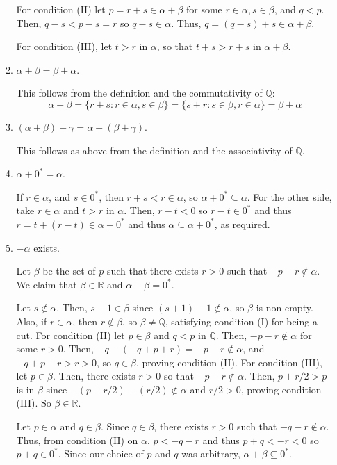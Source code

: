 \documentclass{scrbook}
\newcommand{\Q}{\mathbb{Q}}
\newcommand{\R}{\mathbb{R}}
\begin{document}
\begin{enumerate}[Step 1.]
\begin{enumerate}[({A}1)]
For condition (II) let $p = r + s \in \alpha + \beta$ for some $r \in \alpha, s \in \beta$, and $q < p$. Then, $q - s < p - s = r$ so $q - s \in \alpha$. Thus, $q = (q - s) + s \in \alpha + \beta$. 

For condition (III), let $t > r$ in $\alpha$, so that $t + s > r + s$ in $\alpha + \beta$. 

\item $\alpha + \beta = \beta + \alpha$.

This follows from the definition and the commutativity of $\Q$:
\[
	\alpha + \beta = \{r + s : r \in \alpha, s \in \beta\} = \{s + r : s \in \beta, r \in \alpha\} = \beta + \alpha
\]

\item $(\alpha + \beta) + \gamma = \alpha + (\beta + \gamma)$. 

This follows as above from the definition and the associativity of $\Q$.

\item $\alpha + 0^* = \alpha$.

If $r \in \alpha$, and $s \in 0^*$, then $r + s < r \in \alpha$, so $\alpha + 0^* \subseteq \alpha$. For the other side, take $r \in \alpha$ and $t > r$ in $\alpha$. Then, $r - t < 0$ so $r - t \in 0^*$ and thus $r = t + (r - t) \in \alpha + 0^*$ and thus $\alpha \subseteq \alpha + 0^*$, as required.

\item $-\alpha$ exists.

Let $\beta$ be the set of $p$ such that there exists $r > 0$ such that $-p - r \not\in \alpha$. We claim that $\beta \in \R$ and $\alpha + \beta = 0^*$.

Let $s \not \in \alpha$. Then, $s + 1 \in \beta$ since $(s + 1) - 1 \not\in \alpha$, so $\beta$ is non-empty. Also, if $r \in \alpha$, then $r \not \in \beta$, so $\beta \ne \Q$, satisfying condition (I) for being a cut. For condition (II) let $p \in \beta$ and $q < p$ in $\Q$. Then, $-p - r \not\in \alpha$ for some $r > 0$. Then, $-q - (-q + p + r) = -p - r \not\in \alpha$, and $-q + p + r > r > 0$, so $q \in \beta$, proving condition (II). For condition (III), let $p \in \beta$. Then, there exists $r > 0$ so that $-p - r \not\in \alpha$. Then, $p + r/2 > p$ is in $\beta$ since $-(p + r/2) - (r/2) \not\in \alpha$ and $r/2 > 0$, proving condition (III). So $\beta \in \R$.

Let $p \in \alpha$ and $q \in \beta$. Since $q \in \beta$, there exists $r > 0$ such that $-q - r \not\in \alpha$. Thus, from condition (II) on $\alpha$, $p < -q - r$ and thus $p + q < -r < 0$ so $p + q \in 0^*$. Since our choice of $p$ and $q$ was arbitrary, $\alpha + \beta \subseteq 0^*$. 


\end{enumerate}
\end{enumerate}
\end{document}
